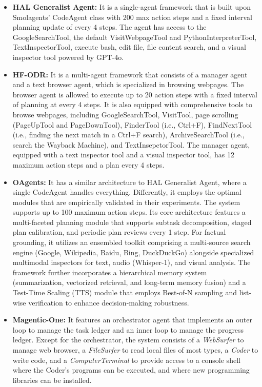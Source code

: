 \begin{itemize}
    \item \textbf{HAL Generalist Agent:} It is a single-agent framework that is built upon Smolagents' CodeAgent class with 200 max action steps and a fixed interval planning update of every 4 steps. The agent has access to the GoogleSearchTool, the default VisitWebpageTool and PythonInterpreterTool, TextInspectorTool, execute bash, edit file, file content search, and a visual inspector tool powered by GPT-4o.
    \item \textbf{HF-ODR:} It is a multi-agent framework that consists of a manager agent and a text browser agent, which is specialized in browsing webpages. The browser agent is allowed to execute up to 20 action steps with a fixed interval of planning at every 4 steps. It is also equipped with comprehensive tools to browse webpages, including GoogleSearchTool, VisitTool, page scrolling (PageUpTool and PageDownTool), FinderTool (i.e., Ctrl+F), FindNextTool (i.e., finding the next match in a Ctrl+F search), ArchiveSearchTool (i.e., search the Wayback Machine), and TextInsepctorTool. The manager agent, equipped with a text inspector tool and a visual inspector tool, has 12 maximum action steps and a plan every 4 steps.
    \item \textbf{OAgents:} It has a similar architecture to HAL Generalist Agent, where a single CodeAgent handles everything. Differently, it employs the optimal modules that are empirically validated in their experiments. The system supports up to 100 maximum action steps. Its core architecture features a multi-faceted planning module that supports subtask decomposition, staged plan calibration, and periodic plan reviews every 1 step. For factual grounding, it utilizes an ensembled toolkit comprising a multi-source search engine (Google, Wikipedia, Baidu, Bing, DuckDuckGo) alongside specialized multimodal inspectors for text, audio (Whisper-1), and visual analysis. The framework further incorporates a hierarchical memory system (summarization, vectorized retrieval, and long-term memory fusion) and a Test-Time Scaling (TTS) module that employs Best-of-N sampling and list-wise verification to enhance decision-making robustness.
    \item \textbf{Magentic-One:} It features an orchestrator agent that implements an outer loop to manage the task ledger and an inner loop to manage the progress ledger. Except for the orchestrator, the system consists of a \textit{WebSurfer} to manage web browser, a \textit{FileSurfer} to read local files of most types, a \textit{Coder} to write code, and a \textit{ComputerTerminal} to provide access to a console shell where the Coder’s programs can be executed, and where new programming libraries can be installed.

\end{itemize}
